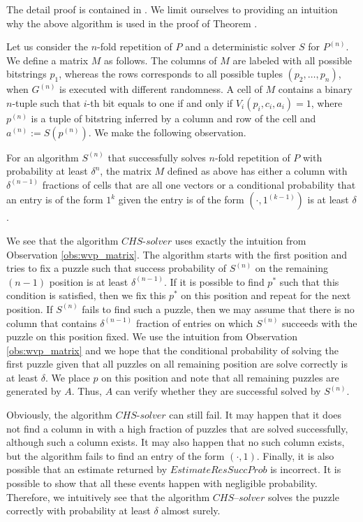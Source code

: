\documentclass[11pt,a4paper,titlepage]{memoir}
\begin{document}
%
The detail proof is contained in \cite{canetti2004hardness}.
We limit ourselves to providing an intuition why the above algorithm is used in the proof of Theorem \label{thm:wvp_chs}.

Let us consider the $n$-fold repetition of $P$ and a deterministic solver $S$ for $P^{(n)}$.
We define a matrix $M$ as follows.
The columns of $M$ are labeled with all possible bitstrings $p_1$,
whereas the rows corresponds to all possible tuples $(p_2, \dotsc, p_n)$, when $G^{(n)}$ is executed with different randomness.
A cell of $M$ contains a binary $n$-tuple such that $i$-th bit equals to one if and only if $V_i(p_i, c_i, a_i) = 1$, where
$p^{(n)}$ is a tuple of bitstring inferred by a column and row of the cell and $a^{(n)} := S(p^{(n)})$.
We make the following observation.
\begin{observation}
\label{obs:wvp_matrix}
For an algorithm $S^{(n)}$ that successfully solves $n$-fold repetition of $P$ with probability at least $\delta^{n}$,
the matrix $M$ defined as above has either a column with $\delta^{(n-1)}$ fractions of cells that are all one vectors or
a conditional probability that an entry is of the form $1^k$ given the entry is of the form $(\cdot, 1^{(k-1)})$ is at least $\delta$.
\end{observation}
%
%
We see that the algorithm $\mathit{CHS\text{-}solver}$ uses exactly the intuition from Observation \ref{obs:wvp_matrix}.
The algorithm starts with the first position and tries to fix a puzzle such that success probability of $S^{(n)}$ on the remaining $(n-1)$
position is at least $\delta^{(n-1)}$. If it is possible to find $p^*$ such that this condition is satisfied, then we fix this $p^*$
on this position and repeat for the next position.
If $S^{(n)}$ fails to find such a puzzle, then we may assume that there is no column that contains $\delta^{(n-1)}$ fraction
of entries on which $S^{(n)}$ succeeds with the puzzle on this position fixed.
We use the intuition from Observation \ref{obs:wvp_matrix} and we hope that the conditional probability of
solving the first puzzle given that all puzzles on all remaining position are solve correctly is at least $\delta$.
We place $p$ on this position and note that all remaining puzzles are generated by $A$. Thus, $A$ can verify whether
they are successful solved by $S^{(n)}$.

Obviously, the algorithm $\mathit{CHS\text{-}solver}$ can still fail. It may happen that it does not find a column in
with a high fraction of puzzles that are solved successfully, although such a column exists.
It may also happen that no such column exists, but the algorithm fails to find an entry of the form $(\cdot, 1)$.
Finally, it is also possible that an estimate returned by $\mathit{EstimateResSuccProb}$ is incorrect.
It is possible to show that all these events happen with negligible probability.
Therefore, we intuitively see that the algorithm $\mathit{CHS\text{--}solver}$
solves the puzzle correctly with probability at least $\delta$ almost surely.
%
\end{document}
